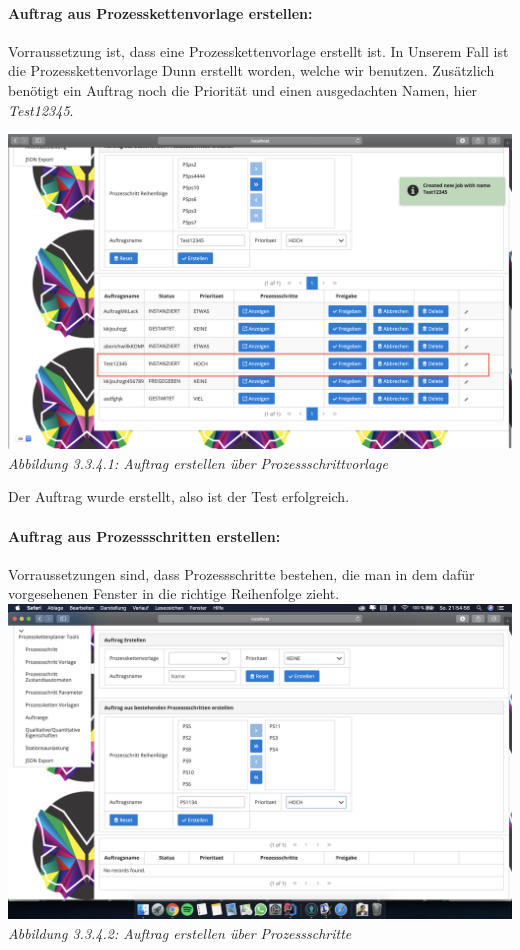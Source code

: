 \documentclass[enabledeprecatedfontcommands,fontsize=12pt,paper=a4,twoside]{scrartcl}
\begin{document}
\paragraph{Auftrag aus Prozesskettenvorlage erstellen:}

Vorraussetzung ist, dass eine Prozesskettenvorlage erstellt ist. In Unserem Fall ist die Prozesskettenvorlage Dunn erstellt worden, welche wir benutzen. Zusätzlich benötigt ein Auftrag noch die Priorität und einen ausgedachten Namen, hier \textit{Test12345}. 

\hypertarget{sc3.3.4.1}{
\includegraphics[width=1\textwidth]{Screenshots/3341.png}
\textit{Abbildung 3.3.4.1: Auftrag erstellen über Prozessschrittvorlage}
} 

Der Auftrag wurde erstellt, also ist der Test erfolgreich. 

%
\paragraph{Auftrag aus Prozessschritten erstellen:}

Vorraussetzungen sind, dass Prozessschritte bestehen, die man in dem dafür vorgesehenen Fenster in die richtige Reihenfolge zieht. \\

\hypertarget{sc3.3.4.2}{
\includegraphics[width=1\textwidth]{Screenshots/3342.png}
\textit{Abbildung 3.3.4.2: Auftrag erstellen über Prozessschritte}
} 
\end{document}
